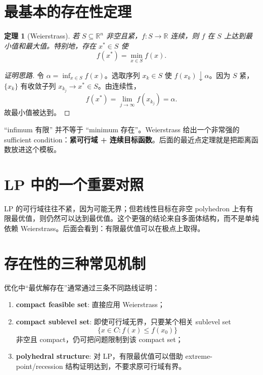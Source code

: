 \documentclass[11pt,a4paper,openany]{ctexrep}
\newtheorem{theorem}{定理}[chapter]
\theoremstyle{definition}
\newcommand{\R}{\mathbb{R}}
\begin{document}
\section{最基本的存在性定理}

\begin{theorem}[Weierstrass]
若 $S\subseteq\R^n$ 非空且紧，$f:S\to\R$ 连续，则 $f$ 在 $S$ 上达到最小值和最大值。特别地，存在 $x^*\in S$ 使
\[
f(x^*)=\min_{x\in S}f(x).
\]
\end{theorem}

\begin{proof}[证明思路]
令 $\alpha=\inf_{x\in S}f(x)$。选取序列 $x_k\in S$ 使 $f(x_k)\downarrow\alpha$。因为 $S$ 紧，$\{x_k\}$ 有收敛子列 $x_{k_j}\to x^*\in S$。由连续性，
\[
f(x^*)=\lim_{j\to\infty}f(x_{k_j})=\alpha.
\]
故最小值被达到。
\end{proof}

\begin{intuitionbox}[它解决的是什么问题？]
``infimum 有限'' 并不等于 ``minimum 存在''。Weierstrass 给出一个非常强的 sufficient condition：\textbf{紧可行域 + 连续目标函数}。后面的最近点定理就是把距离函数放进这个模板。
\end{intuitionbox}

\section{LP 中的一个重要对照}
LP 的可行域往往不紧，因为可能无界；但若线性目标在非空 polyhedron 上有有限最优值，则仍然可以达到最优值。这个更强的结论来自多面体结构，而不是单纯依赖 Weierstrass。后面会看到：有限最优值可以在极点上取得。\cite[Ch.~2, Ch.~4]{bertsimas}


\section{存在性的三种常见机制}
优化中“最优解存在”通常通过三条不同路线证明：
\begin{enumerate}[leftmargin=2.2em]
  \item \textbf{compact feasible set}: 直接应用 Weierstrass；
  \item \textbf{compact sublevel set}: 即使可行域无界，只要某个相关 sublevel set
  \[
  \{x\in C:f(x)\le f(x_0)\}
  \]
  非空且 compact，仍可把问题限制到该 compact set；
  \item \textbf{polyhedral structure}: 对 LP，有限最优值可以借助 extreme-point/recession 结构证明达到，不要求原可行域有界。
\end{enumerate}
\end{document}
